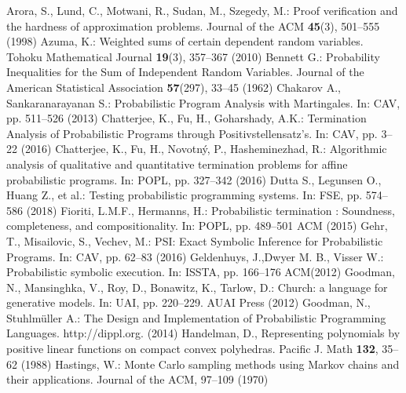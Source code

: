 \documentclass[runningheads]{llncs}
\begin{document}
%
%
%
% 
% 
%
\begin{thebibliography}{8}
Arora, S., Lund, C., Motwani, R., Sudan, M., Szegedy, M.: Proof verification and the hardness of approximation problems. Journal of the ACM \textbf{45}(3), 501--555 (1998)
Azuma, K.: Weighted sums of certain dependent random variables. Tohoku Mathematical Journal \textbf{19}(3), 357--367 (2010)
Bennett G.: Probability Inequalities for the Sum of Independent Random Variables. Journal of the American Statistical Association \textbf{57}(297), 33--45 (1962)
Chakarov A., Sankaranarayanan S.: Probabilistic Program Analysis with Martingales. In: CAV, pp. 511--526  (2013)
Chatterjee, K., Fu, H., Goharshady, A.K.: Termination Analysis of Probabilistic Programs through Positivstellensatz's. In: CAV, pp. 3--22 (2016)
Chatterjee, K., Fu, H., Novotn\'{y}, P., Hasheminezhad, R.: Algorithmic analysis of
qualitative and quantitative termination problems for affine probabilistic programs. In: POPL, pp. 327--342 (2016)
Dutta S., Legunsen O., Huang Z., et al.: Testing probabilistic programming systems. In: FSE, pp. 574--586 (2018)
Fioriti, L.M.F., Hermanns, H.: Probabilistic termination : Soundness, completeness, and compositionality. In: POPL, pp. 489--501 ACM (2015)
Gehr, T., Misailovic, S., Vechev, M.: {PSI:} Exact Symbolic Inference for Probabilistic Programs. In: CAV, pp. 62--83 (2016)
Geldenhuys, J.,Dwyer M. B., Visser W.: Probabilistic symbolic execution. In: ISSTA, pp. 166--176 ACM(2012)
Goodman, N., Mansinghka, V., Roy, D., Bonawitz, K., Tarlow, D.: Church: a language for generative models. In: UAI, pp. 220--229. AUAI Press (2012)
Goodman, N., Stuhlmüller A.: The Design and Implementation of Probabilistic Programming Languages. http://dippl.org.  (2014)
Handelman, D., Representing polynomials by positive linear functions on compact convex polyhedras. Pacific J. Math \textbf{132}, 35--62 (1988)
Hastings, W.: Monte Carlo sampling methods using Markov chains and their applications. Journal of the ACM, 97--109 (1970)

\end{thebibliography}
\end{document}
